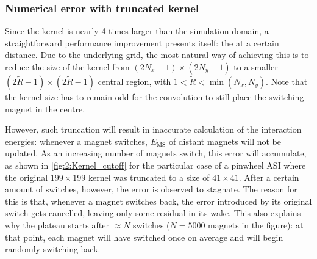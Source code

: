 \subsubsection{Numerical error with truncated kernel}\label{sec:2:Kernels:Error}
Since the kernel is nearly 4 times larger than the simulation domain, a straightforward performance improvement presents itself:  the  at a certain distance.
Due to the underlying grid, the most natural way of achieving this is to reduce the size of the kernel from $(2N_x-1) \times (2N_y-1)$ to a smaller $(2\widetilde{R}-1) \times (2\widetilde{R}-1)$ central region, with $1 < \widetilde{R} < \min(N_x,N_y)$.
Note that the kernel size has to remain odd for the convolution to still place the switching magnet in the centre. \par
However, such truncation will result in inaccurate calculation of the interaction energies: whenever a magnet switches, $E_\mathrm{MS}$ of distant magnets will not be updated.
As an increasing number of magnets switch, this error will accumulate, as shown in \cref{fig:2:Kernel_cutoff} for the particular case of a pinwheel ASI where the original $199 \times 199$ kernel was truncated to a size of $41 \times 41$.
After a certain amount of switches, however, the error is observed to stagnate.
The reason for this is that, whenever a magnet switches back, the error introduced by its original switch gets cancelled, leaving only some residual  in its wake.
This also explains why the plateau starts after $\approx N$ switches ($N=5000$ magnets in the figure): at that point, each magnet will have switched once on average and will begin randomly switching back.


